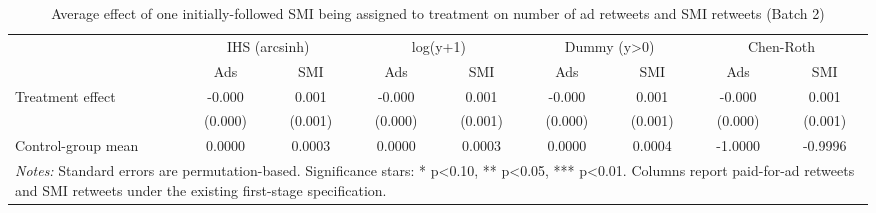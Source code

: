 \begin{table}[!htbp]
\centering
\caption{Average effect of one initially-followed SMI being assigned to treatment on number of ad retweets and SMI retweets (Batch 2)}
\begin{tabular}{lcccccccc}
\hline
 & \multicolumn{2}{c}{IHS (arcsinh)} & \multicolumn{2}{c}{log(y+1)} & \multicolumn{2}{c}{Dummy (y>0)} & \multicolumn{2}{c}{Chen-Roth} \\
 & Ads & SMI & Ads & SMI & Ads & SMI & Ads & SMI \\
\hline
Treatment effect & -0.000 & 0.001 & -0.000 & 0.001 & -0.000 & 0.001 & -0.000 & 0.001 \\
 & (0.000) & (0.001) & (0.000) & (0.001) & (0.000) & (0.001) & (0.000) & (0.001) \\
Control-group mean & 0.0000 & 0.0003 & 0.0000 & 0.0003 & 0.0000 & 0.0004 & -1.0000 & -0.9996 \\
\hline
\multicolumn{9}{l}{\parbox[t]{15.5cm}{\textit{Notes:} Standard errors are permutation-based. Significance stars: * p<0.10, ** p<0.05, *** p<0.01. Columns report paid-for-ad retweets and SMI retweets under the existing first-stage specification.}} \\
\end{tabular}
\end{table}
